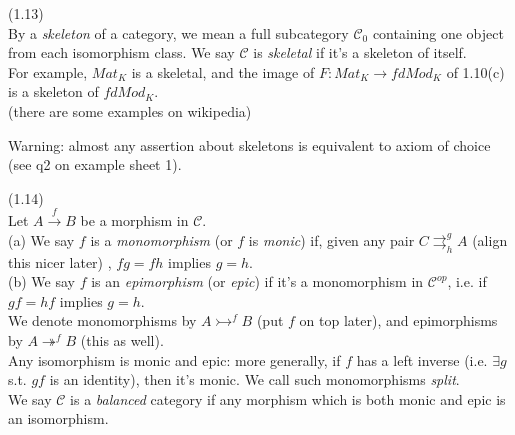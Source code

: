 \documentclass[a4paper]{article}
\begin{document}
\begin{defi} (1.13) \\
    By a \emph{skeleton} of a category, we mean a full subcategory $\mathcal{C}_0$ containing one object from each isomorphism class. We say $\mathcal{C}$ is \emph{skeletal} if it's a skeleton of itself.\\
    For example, $Mat_K$ is a skeletal, and the image of $F:Mat_K \to fdMod_K$ of 1.10(c) is a skeleton of $fdMod_K$.\\
    (there are some examples on wikipedia)
\end{defi}

Warning: almost any assertion about skeletons is equivalent to axiom of choice (see q2 on example sheet 1).

\begin{defi} (1.14)\\
    Let $A \xrightarrow{f} B$ be a morphism in $\mathcal{C}$.\\
    (a) We say $f$ is a \emph{monomorphism} (or $f$ is \emph{monic}) if, given any pair $C \rightrightarrows_h^g A$ (align this nicer later) , $fg=fh$ implies $g=h$.\\
    (b) We say $f$ is an \emph{epimorphism} (or \emph{epic}) if it's a monomorphism in $\mathcal{C}^{op}$, i.e. if $gf = hf$ implies $g=h$.\\
    We denote monomorphisms by $A \rightarrowtail^f B$ (put $f$ on top later), and epimorphisms by $A \twoheadrightarrow^f B$ (this as well).\\
    Any isomorphism is monic and epic: more generally, if $f$ has a left inverse (i.e. $\exists g$ s.t. $gf$ is an identity), then it's monic. We call such monomorphisms \emph{split}.\\
    We say $\mathcal{C}$ is a \emph{balanced} category if any morphism which is both monic and epic is an isomorphism.
\end{defi}
\end{document}
